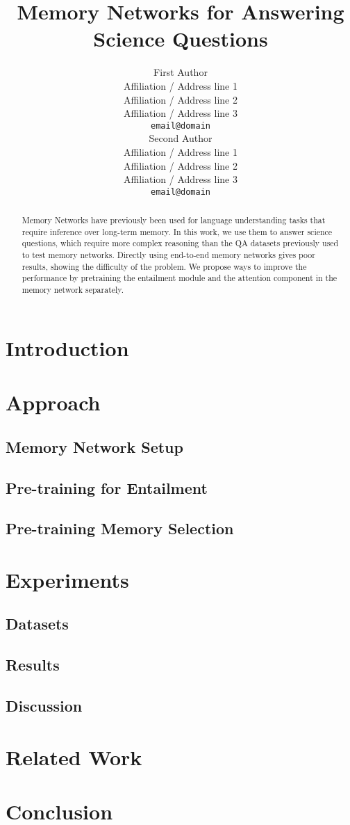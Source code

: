 \documentclass[11pt]{article}
\title{Memory Networks for Answering Science Questions}
\author{First Author \\
  Affiliation / Address line 1 \\
  Affiliation / Address line 2 \\
  Affiliation / Address line 3 \\
  {\tt email@domain} \\\And
  Second Author \\
  Affiliation / Address line 1 \\
  Affiliation / Address line 2 \\
  Affiliation / Address line 3 \\
  {\tt email@domain} \\}
\date{}
\begin{document}
\maketitle
\begin{abstract}
Memory Networks have previously been used for language understanding tasks that require inference over long-term memory. In this work, we use them to answer science questions, which require more complex reasoning than the QA datasets previously used to test memory networks. Directly using end-to-end memory networks \cite{sukhbaatar2015end} gives poor results, showing the difficulty of the problem. We propose ways to improve the performance by pretraining the entailment module and the attention component in the memory network separately.
\end{abstract}
\section{Introduction}

\section{Approach}
\subsection{Memory Network Setup}
\subsection{Pre-training for Entailment}
\subsection{Pre-training Memory Selection}


\section{Experiments}
\subsection{Datasets}
\subsection{Results}
\subsection{Discussion}

\section{Related Work}


\section{Conclusion}


\end{document}
